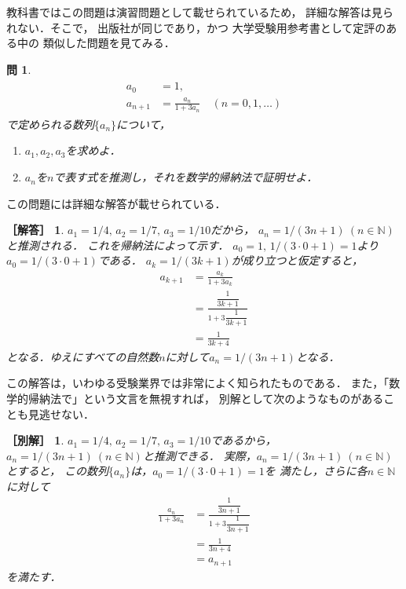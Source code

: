 \documentclass[11pt,a4paper]{ltjsarticle} %
\theoremstyle{mystyle} %
\newtheorem{que}{問} %
\newtheorem*{ans}{［解答］} %
\newtheorem*{ans2}{［別解］} %
\begin{document}
教科書ではこの問題は演習問題として載せられているため，
詳細な解答は見られない．そこで，
出版社が同じであり，かつ
大学受験用参考書として定評のある\cite{chert}中の
類似した問題を見てみる．
\begin{que} \label{que:suisokuchert}
  \begin{align}
    \begin{aligned}
      a_0 & = 1, \\
      a_{n+1} & = \frac{a_n}{1 + 3 a_n} \quad ( n = 0,1,\ldots )
    \end{aligned}
    \label{eq:zenkasiki}
  \end{align}
  で定められる数列$\{ a_n \}$について，
  \begin{enumerate}
    \item $a_1,a_2,a_3$を求めよ．
    \item $a_n$を$n$で表す式を推測し，それを数学的帰納法で証明せよ．
  \end{enumerate}
\end{que}

この問題には詳細な解答が載せられている．

\begin{ans}
  $a_1=1/4, \, a_2 = 1/7 , \, a_3 = 1/10$だから，
  $a_n = 1/(3n+1) \ (n \in \mathbb{N})$と推測される．
  これを帰納法によって示す．
  $a_0 = 1, \, 1/(3 \cdot 0+1)=1$より
  $a_0 = 1/ (3 \cdot 0 +1 )$である．
  $a_k= 1/(3k+1)$が成り立つと仮定すると，
  \begin{align*}
    a_{k+1} & = \frac{a_k}{1+3a_k} \\
            & = \frac{ \dfrac{1}{3k+1} }{ 1 + 3 \dfrac{1}{3k+1} } \\
            & = \frac{1}{3k+4}
  \end{align*}
  となる．ゆえにすべての自然数$n$に対して$a_n=1/(3n+1)$となる．
\end{ans}

この解答は，いわゆる受験業界では非常によく知られたものである．
また，「数学的帰納法で」という文言を無視すれば，
別解として次のようなものがあることも見逃せない．

\begin{ans2}
  $a_1 = 1/4 , \, a_2 = 1/7 , \, a_3 = 1/10$であるから，
  $a_n = 1/(3n+1) \ (n \in \mathbb{N})$と推測できる．
  実際，$a_n = 1/(3n+1) \ (n \in \mathbb{N})$とすると，
  この数列$\{ a_n \}$は，$a_0 = 1/(3 \cdot 0 + 1)=1$を
  満たし，さらに各$n \in \mathbb{N}$に対して
  \begin{align*}
    \frac{a_n}{1+ 3 a_n} & = 
    \frac{ \dfrac{1}{3n+1} }{ 1+ 3 \dfrac{1}{3n+1} } \\
    & = \frac{1}{3n+4} \\
    & = a_{n+1}
  \end{align*}
  を満たす．
\end{ans2}
\end{document}
